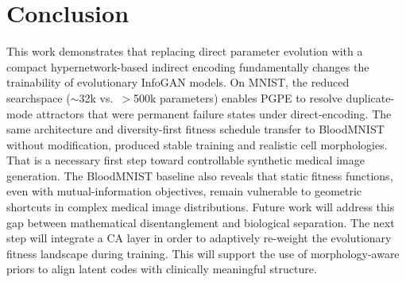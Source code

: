 \documentclass[letterpaper]{article} %
\begin{document}
	\section{Conclusion}  This work demonstrates that replacing direct parameter evolution with a compact hypernetwork-based indirect encoding fundamentally changes the trainability of evolutionary InfoGAN models. On MNIST, the reduced searchspace (${\sim}$32k vs.\ $>$500k parameters) enables PGPE to resolve duplicate-mode attractors that were permanent failure states under direct-encoding. The same architecture and diversity-first fitness schedule transfer to BloodMNIST without modification, produced stable training and realistic cell morphologies. That is a necessary first step toward controllable synthetic medical image generation.
	The BloodMNIST baseline also reveals that static fitness functions, even with mutual-information objectives, remain vulnerable to geometric shortcuts in complex medical image distributions. Future work will address this gap between mathematical disentanglement and biological separation. The next step will integrate a CA layer in order to adaptively re-weight the evolutionary fitness landscape during training. This will support the use of morphology-aware priors to align latent codes with clinically meaningful structure.

	
	
\end{document}
